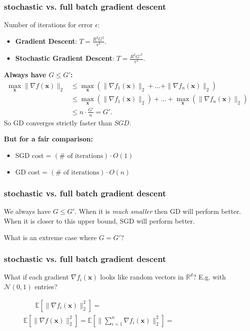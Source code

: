 \documentclass[compress]{beamer}
\newcommand{\bv}[1]{\mathbf{#1}}
\newcommand{\R}{\mathbb{R}}
\newcommand{\E}{\mathbb{E}}
\begin{document}
\begin{frame}[t]
	\frametitle{stochastic vs. full batch gradient descent}
	Number of iterations for error $\epsilon$:
	\begin{itemize}
		\item \textbf{Gradient Descent}: $T = \frac{R^2 G^2}{\epsilon^2}$. 
		\item \textbf{Stochastic Gradient Descent}: $T = \frac{R^2 G'^2}{\epsilon^2}$. 
	\end{itemize}
	
	\textbf{Always have $G \leq G'$:}
	\begin{align*}
		\max_{\bv{x}} \|\nabla f(\bv{x})\|_2 &\leq\max_{\bv{x}}\left( \|\nabla f_1(\bv{x})\|_2 + \ldots + \|\nabla f_n(\bv{x})\|_2\right) \\
		&\leq \max_{\bv{x}}\left( \|\nabla f_1(\bv{x})\|_2\right)+ \ldots + \max_{\bv{x}}\left( \|\nabla f_n(\bv{x})\|_2\right) \\
		&\leq n\cdot\frac{G'}{n} = G'.
	\end{align*}
So GD converges strictly faster than $SGD$. 
	
	\textbf{But for a fair comparison:}
	\begin{itemize}
		\item SGD cost = $(\# \text{ of iterations})\cdot O(1)$
		\item GD cost = $(\# \text{ of iterations})\cdot O(n)$
	\end{itemize}
\end{frame}

\begin{frame}[t]
	\frametitle{stochastic vs. full batch gradient descent}
	We always have $G \leq G'$. When it is \emph{much smaller} then GD will perform better. When it is closer to this upper bound, SGD will perform better. 
	
	\begin{center}
	What is an extreme case where $G = G'$? 
	\end{center}
\end{frame}

\begin{frame}[t]
	\frametitle{stochastic vs. full batch gradient descent}
	What if each gradient $\nabla f_i(\bv{x})$ looks like random vectors in $\R^d$? E.g. with $\mathcal{N}(0,1)$ entries? 
	
	\begin{align*}
		\E \left[\|\nabla f_i(\bv{x})\|_2^2\right] = \hspace{17em}
	\end{align*}
	\begin{align*}
		\E \left[\|\nabla f(\bv{x})\|_2^2\right] = \E \left[\|\sum_{i=1}^n\nabla f_i(\bv{x})\|_2^2\right] = \hspace{8em}
	\end{align*}

\vspace{5em}

\end{frame}
\end{document}
